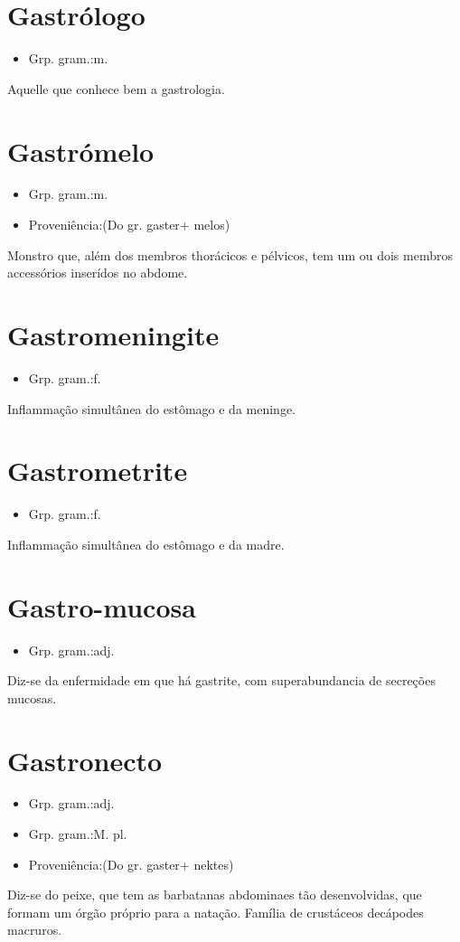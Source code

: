 \section{Gastrólogo}
\begin{itemize}
\item {Grp. gram.:m.}
\end{itemize}
Aquelle que conhece bem a gastrologia.
\section{Gastrómelo}
\begin{itemize}
\item {Grp. gram.:m.}
\end{itemize}
\begin{itemize}
\item {Proveniência:(Do gr. \textunderscore gaster\textunderscore  + \textunderscore melos\textunderscore )}
\end{itemize}
Monstro que, além dos membros thorácicos e pélvicos, tem um ou dois membros accessórios inserídos no abdome.
\section{Gastromeningite}
\begin{itemize}
\item {Grp. gram.:f.}
\end{itemize}
Inflammação simultânea do estômago e da meninge.
\section{Gastrometrite}
\begin{itemize}
\item {Grp. gram.:f.}
\end{itemize}
Inflammação simultânea do estômago e da madre.
\section{Gastro-mucosa}
\begin{itemize}
\item {Grp. gram.:adj.}
\end{itemize}
Diz-se da enfermidade em que há gastrite, com superabundancia de secreções mucosas.
\section{Gastronecto}
\begin{itemize}
\item {Grp. gram.:adj.}
\end{itemize}
\begin{itemize}
\item {Grp. gram.:M. pl.}
\end{itemize}
\begin{itemize}
\item {Proveniência:(Do gr. \textunderscore gaster\textunderscore  + \textunderscore nektes\textunderscore )}
\end{itemize}
Diz-se do peixe, que tem as barbatanas abdominaes tão desenvolvidas, que formam um órgão próprio para a natação.
Família de crustáceos decápodes macruros.

